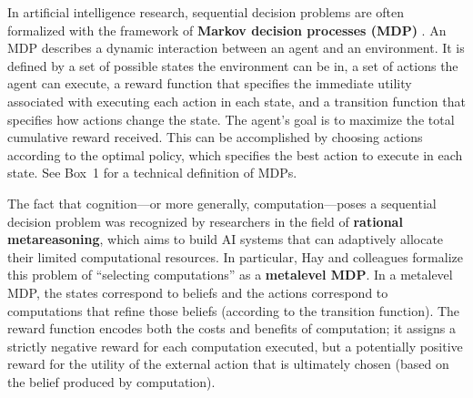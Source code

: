 In artificial intelligence research, sequential decision problems are often formalized with the framework of \textbf{Markov decision processes (MDP)} \citep{puterman2014markov,sutton2018reinforcement}. An MDP describes a dynamic interaction between an agent and an environment. It is defined by a set of possible states the environment can be in, a set of actions the agent can execute, a reward function that specifies the immediate utility associated with executing each action in each state, and a transition function that specifies how actions change the state. The agent's goal is to maximize the total cumulative reward received. This can be accomplished by choosing actions according to the optimal policy, which specifies the best action to execute in each state. See Box~1 for a technical definition of MDPs.


The fact that cognition---or more generally, computation---poses a sequential decision problem was recognized by researchers in the field of \textbf{rational metareasoning}, which aims to build AI systems that can adaptively allocate their limited computational resources. In particular, Hay and colleagues \citealp{hay2012selecting,hay2016principles} formalize this problem of ``selecting computations'' as a \textbf{metalevel MDP}. In a metalevel MDP, the states correspond to beliefs and the actions correspond to computations that refine those beliefs (according to the transition function). The reward function encodes both the costs and benefits of computation; it assigns a strictly negative reward for each computation executed, but a potentially positive reward for the utility of the external action that is ultimately chosen (based on the belief produced by computation).

